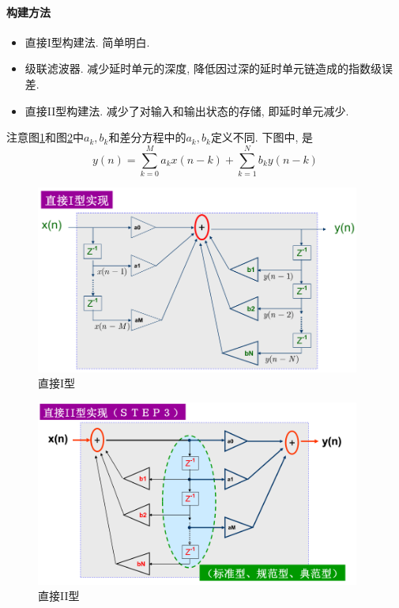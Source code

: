 \documentclass{ctexart}
\begin{document}
\paragraph{构建方法} \begin{itemize}
        \item 直接I型构建法. 简单明白.
        \item 级联滤波器. 减少延时单元的深度, 降低因过深的延时单元链造成的指数级误差.
        \item 直接II型构建法. 减少了对输入和输出状态的存储, 即延时单元减少.
    \end{itemize}注意图\ref{dir-1}和图\ref{dir-2}中$a_k, b_k$和差分方程中的$a_k, b_k$定义不同. 下图中, 是\[
        y(n) = \sum_{k = 0}^M a_k x(n-k) + \sum_{k = 1}^{N} b_k y(n-k)\]
    \begin{figure}[ht!]
    \centering
    \includegraphics[width=0.95\textwidth]{dir-1.png}
    \caption{直接I型}
    \label{dir-1}
    \end{figure}
    \begin{figure}[ht!]
    \centering
    \includegraphics[width=0.95\textwidth]{dir-2.png}
    \caption{直接II型}
    \label{dir-2}
    \end{figure}
\end{document}
